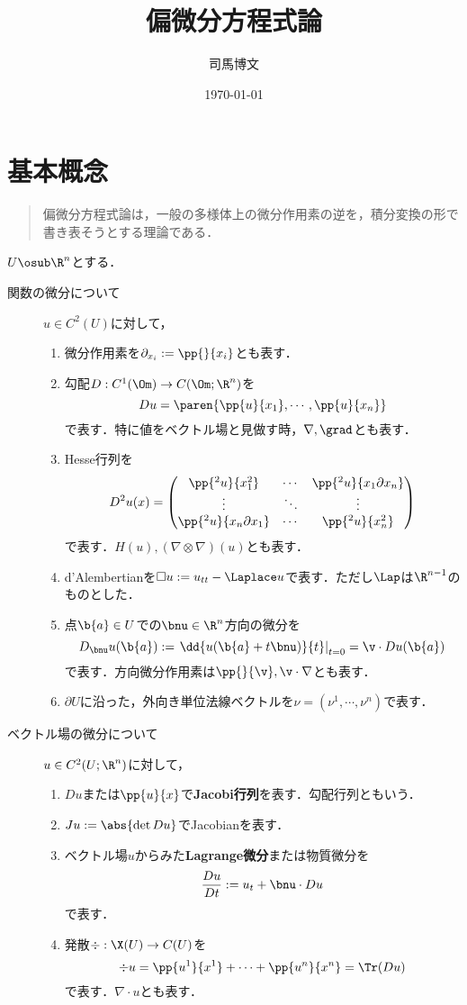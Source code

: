 \documentclass[uplatex,dvipdfmx]{jsreport}
\title{偏微分方程式論}\author{司馬博文}\date{\today}
\begin{document}
\tableofcontents

\chapter{基本概念}

\begin{quotation}
    偏微分方程式論は，一般の多様体上の微分作用素の逆を，積分変換の形で書き表そうとする理論である．
\end{quotation}

\begin{notation}
    $U\osub\R^n$とする．
    \begin{description}
        \item[関数の微分について] $u\in C^2(U)$に対して，
        \begin{enumerate}
            \item 微分作用素を$\partial_{x_i}:=\pp{}{x_i}$とも表す．
            \item 勾配$D:C^1(\Om)\to C(\Om;\R^n)$を
            \[Du=\paren{\pp{u}{x_1},\cdots,\pp{u}{x_n}}\]
            で表す．特に値をベクトル場と見做す時，$\nabla,\grad$とも表す．
            \item Hesse行列を
            \[D^2u(x)=\begin{pmatrix}\pp{^2u}{x_1^2}&\cdots&\pp{^2u}{x_1\partial x_n}\\\vdots&\ddots&\vdots\\\pp{^2u}{x_n\partial x_1}&\cdots&\pp{^2u}{x_n^2}\end{pmatrix}\]
            で表す．$H(u),(\nabla\otimes\nabla)(u)$とも表す．
            \item d'Alembertianを$\Box u:=u_{tt}-\Laplace u$で表す．ただし$\Lap$は$\R^{n-1}$のものとした．
            \item 点$\b{a}\in U$での$\bnu\in\R^n$方向の微分を
            \[D_{\bnu}u(\b{a}):=\left.\dd{u(\b{a}+t\bnu)}{t}\right|_{t=0}=\v\cdot Du(\b{a})\]
            で表す．方向微分作用素は$\pp{}{\v},\v\cdot\nabla$とも表す．
            \item $\partial U$に沿った，外向き単位法線ベクトルを$\nu=(\nu^1,\cdots,\nu^n)$で表す．
        \end{enumerate}
        \item[ベクトル場の微分について] $u\in C^2(U;\R^n)$に対して，
        \begin{enumerate}
            \item $Du$または$\pp{u}{x}$で\textbf{Jacobi行列}を表す．勾配行列ともいう．
            \item $Ju:=\abs{\det Du}$でJacobianを表す．
            \item ベクトル場$u$からみた\textbf{Lagrange微分}または物質微分を
            \[\frac{Du}{Dt}:=u_t+\bnu\cdot Du\]
            で表す．
            \item 発散$\div:\X(U)\to C(U)$を
            \[\div u=\pp{u^1}{x^1}+\cdots+\pp{u^n}{x^n}=\Tr(Du)\]
            で表す．$\nabla\cdot u$とも表す．
        \end{enumerate}
    \end{description}
\end{notation}
\end{document}
